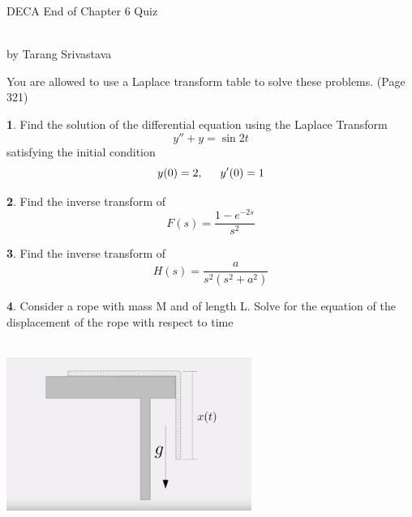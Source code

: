 \documentclass[11pt]{article}
\author{Tarang Srivastava}
\newcommand{\makechaptertitle}[1]{
\begin{center}
	\begin{large}
		DECA End of Chapter #1 Quiz
	\end{large}
	\begin{small}
		\\by Tarang Srivastava
	\end{small}
\end{center}
}
\theoremstyle{definition}
\newtheorem{q}{}
\begin{document}
	\begin{multicols*}{2}
		\makechaptertitle{6}
		You are allowed to use a Laplace transform table to solve these problems. (Page 321)
		\begin{q}
			Find the solution of the differential equation using the Laplace Transform\[ y'' + y = \sin 2t \] satisfying the initial condition \[ y(0) = 2, \indent y'(0) = 1 \]
		\end{q}
		\begin{q}
			Find the inverse transform of 
			\[ F(s) = \dfrac{1-e^{-2s}}{s^2} \]
		\end{q}
		\begin{q}
			Find the inverse transform of \[ H(s) = \dfrac{a}{s^2(s^2+a^2)} \]
		\end{q}
		\begin{q}
			Consider a rope with mass M and of length L. Solve for the equation of the displacement of the rope with respect to time \\ \\
			\begin{center}
				\includegraphics[width=8cm]{ropemass}
			\end{center}

		\end{q}
	

\end{multicols*}
\end{document}
